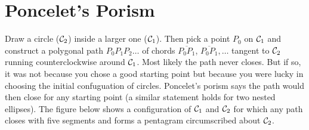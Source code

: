 \documentclass{ximera}
\begin{document}

\section*{Poncelet's Porism}




Draw a circle (${\cal C}_2$) inside a larger one (${\cal C}_1$). Then pick a point $P_0$ on ${\cal C}_1$ and construct a polygonal path $P_0 P_1 P_2 \ldots$ of chords $\overline{P_0P_1}$, $\overline{P_0P_1}, \ldots$ tangent to ${\cal C}_2$ running counterclockwise around ${\cal C}_1$. Most likely the path never closes.  But if so, it was not because you chose a good starting point but because you were lucky in choosing the initial confuguation of circles. Poncelet's porism says the path would then close for any starting point (a similar statement holds for two nested ellipses). The figure below shows a configuration of ${\cal C}_1$ and ${\cal C}_2$ for which any path closes with five segments and forms a pentagram circumscribed about ${\cal C}_2$.

\end{document}
